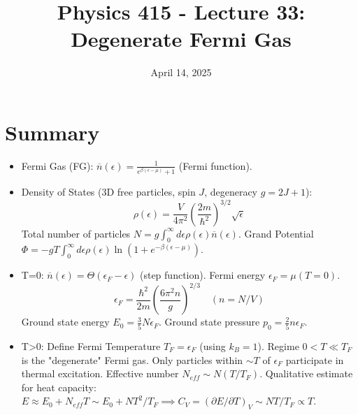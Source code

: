 \documentclass[11pt]{article}
\title{Physics 415 - Lecture 33: Degenerate Fermi Gas}
\date{April 14, 2025}
\author{} %
\newcommand{\eps}{\epsilon}
\newcommand{\nbar}{\overline{n}} %
\newcommand{\ef}{\epsilon_F} %
\newcommand{\tf}{T_F} %
\begin{document}
\maketitle
\thispagestyle{empty}

\section*{Summary}

\begin{itemize}
    \item Fermi Gas (FG): $\nbar(\eps) = \frac{1}{e^{\beta(\eps-\mu)} + 1}$ (Fermi function).
    \item Density of States (3D free particles, spin $J$, degeneracy $g=2J+1$):
    \[ \rho(\eps) = \frac{V}{4\pi^2} \left( \frac{2m}{\hbar^2} \right)^{3/2} \sqrt{\eps} \]
    Total number of particles $N = g \int_0^\infty d\eps \rho(\eps) \nbar(\eps)$.
    Grand Potential $\Phi = -gT \int_0^\infty d\eps \rho(\eps) \ln(1 + e^{-\beta(\eps-\mu)})$.
    \item T=0: $\nbar(\eps) = \Theta(\ef - \eps)$ (step function). Fermi energy $\ef = \mu(T=0)$.
    \[ \ef = \frac{\hbar^2}{2m} \left( \frac{6\pi^2 n}{g} \right)^{2/3} \quad (n=N/V) \]
    Ground state energy $E_0 = \frac{3}{5} N \ef$. Ground state pressure $p_0 = \frac{2}{5} n \ef$.
    \item T>0: Define Fermi Temperature $\tf = \ef$ (using $k_B=1$).
    Regime $0 < T \ll \tf$ is the "degenerate" Fermi gas.
    Only particles within $\sim T$ of $\ef$ participate in thermal excitation. Effective number $N_{eff} \sim N (T/\tf)$.
    Qualitative estimate for heat capacity: $E \approx E_0 + N_{eff} T \sim E_0 + N T^2/\tf \implies C_V = (\partial E/\partial T)_V \sim N T / \tf \propto T$.
\end{itemize}

\begin{center}
\end{center}
\end{document}
